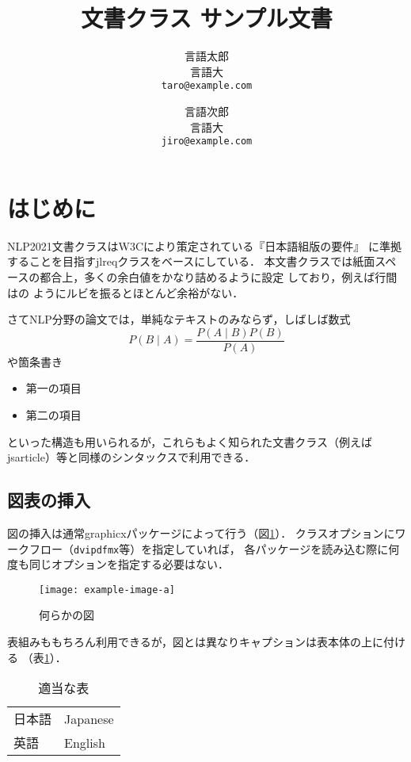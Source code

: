 \documentclass[
  platex, dvipdfmx,  %
]{nlp2021}
\title{\pkg{NLP2021}文書クラス サンプル文書}
\author{%
  言語太郎 \\ 言語大 \\ \texttt{taro@example.com}\and
  言語次郎 \\ 言語大 \\ \texttt{jiro@example.com}}
\newcommand{\pkg}[1]{\textsf{#1}}
\newcommand{\code}[1]{\texttt{#1}}
\begin{document}
\maketitle

\section{はじめに}

\pkg{NLP2021}文書クラスはW3Cにより策定されている『日本語組版の要件』%
\cite{JLREQ}に準拠することを目指す\pkg{jlreq}クラスをベースにしている．
本文書クラスでは紙面スペースの都合上，多くの余白値をかなり詰めるように設定
しており，例えば行間はの
ようにルビを振るとほとんど余裕がない．

さてNLP分野の論文では，単純なテキストのみならず，しばしば数式
%
\begin{equation}
P(B\mid A) = \frac{P(A\mid B)P(B)}{P(A)}
\end{equation}
%
や箇条書き
%
\begin{itemize}
\item 第一の項目
\item 第二の項目
\end{itemize}
%
といった構造も用いられるが，これらもよく知られた文書クラス（例えば
\pkg{jsarticle}）等と同様のシンタックスで利用できる．

\subsection{図表の挿入}

図の挿入は通常\pkg{graphicx}パッケージによって行う（図\ref{fig:sample}）．
クラスオプションにワークフロー（\code{dvipdfmx}等）を指定していれば，
各パッケージを読み込む際に何度も同じオプションを指定する必要はない．
%
\begin{figure}[h]
\centering
\texttt{[image: example-image-a]}
\caption{何らかの図}
\label{fig:sample}
\end{figure}

表組みももちろん利用できるが，図とは異なりキャプションは表本体の上に付ける
（表\ref{tab:sample}）．
%
\begin{table}[h]
\centering
\caption{適当な表}
\label{tab:sample}
\begin{tabular}{ll}
\hline
日本語 & Japanese \\
英語 & English \\
\hline
\end{tabular}
\end{table}
\end{document}
